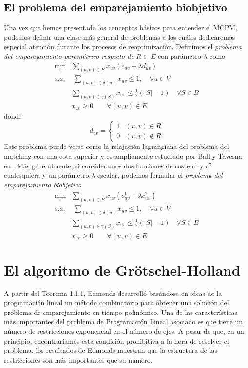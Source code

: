 \documentclass[twoside,a4paper,openright,12pt,tikz]{book}
\begin{document}
\subsection{El problema del emparejamiento biobjetivo}
Una vez que hemos presentado los conceptos básicos para entender el MCPM, podemos definir una clase más general de problemas a los cuáles dedicaremos especial atención durante los procesos de reoptimización. Definimos el \textit{problema del emparejamiento paramétrico respecto de $R\subset E$} con parámetro $\lambda$ como
\begin{align*}
\min_x & \sum_{(u,v) \in E}x_{uv} (c_{uv} + \lambda d_{uv})\\
s.a.&\;\sum_{(u,v)\in\delta(u)} x_{uv} \leq 1, \quad \forall u \in V\\
&\sum_{(u,v)\in \gamma(S)} x_{uv} \leq \frac{1}{2}(|S|-1)\quad \forall S \in B	\\
&x_{uv} \geq 0 \qquad \forall(u,v)\in E
\end{align*}
donde 
$$
d_{uv} = \begin{cases}
1 & (u,v)\in R\\
0 & (u,v)\notin R
\end{cases}
$$
Este problema puede verse como la relajación lagrangiana del problema del matching con una cota superior y es ampliamente estudiado por Ball y Taverna en \cite{balltab}. 
Más generalmente, si consideramos dos funciones de coste $c^1$ y $c^2$ cualesquiera y un parámetro $\lambda$ escalar, podemos formular el \textit{problema del emparejamiento biobjetivo}
\begin{align*}
\min_x & \sum_{(u,v) \in E}x_{uv}(c^1_{uv}+\lambda c^2_{uv})\\
s.a.&\;\sum_{(u,v)\in\delta(u)} x_{uv} \leq 1, \quad \forall u \in V\\
&\sum_{(u,v)\in \gamma(S)} x_{uv} \leq \frac{1}{2}(|S|-1)\quad \forall S \in B	\\
&x_{uv} \geq 0 \qquad \forall(u,v)\in E
\end{align*}
\section{El algoritmo de Grötschel-Holland}
A partir del Teorema 1.1.1, Edmonds desarrolló basándose en ideas de la programación lineal un método combinatorio \cite{edmond} para obtener una solución del problema de emparejamiento en tiempo polinómico. Una de las características más importantes del problema de Programación Lineal asociado es que tiene un número de restricciones exponencial en el número de ejes. A pesar de que, en un principio, encontraríamos esta condición prohibitiva a la hora de resolver el problema, los resultados de Edmonds muestran que la estructura de las restricciones son más importantes que su número. 
\end{document}
